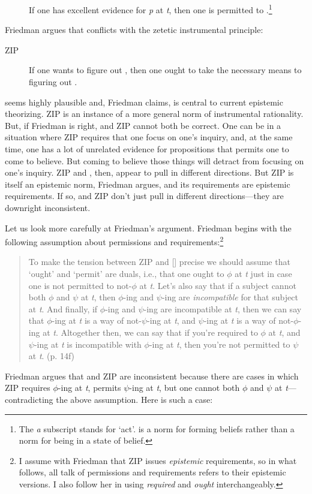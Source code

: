 \documentclass[12pt]{article}
\begin{document}
\begin{description}
    \item[\ep] If one has excellent evidence for \textit{p} at \textit{t}, then one is permitted to \jud{}.\footnote{The \textit{a} subscript stands for `act'. \ep{} is a norm for forming beliefs rather than a norm for being in a state of belief.}
\end{description}
%
Friedman argues that \ep{} conflicts with the zetetic instrumental principle:
%
\begin{description}
    \item[ZIP] If one wants to figure out , then one ought to take the necessary means to figuring out .
\end{description}
%
\ep{} seems highly plausible and, Friedman claims, is central to current epistemic theorizing. ZIP is an instance of a more general norm of instrumental rationality. But, if Friedman is right, \ep{} and ZIP cannot both be correct. One can be in a situation where ZIP requires that one focus on one’s inquiry, and, at the same time, one has a lot of unrelated evidence for propositions that \ep{} permits one to come to believe. But coming to believe those things will detract from focusing on one’s inquiry. ZIP and \ep{}, then, appear to pull in different directions. But ZIP is itself an epistemic norm, Friedman argues, and its requirements are epistemic requirements. If so, \ep{} and ZIP don’t just pull in different directions---they are downright inconsistent.

Let us look more carefully at Friedman’s argument. Friedman begins with the following assumption about permissions and requirements:\footnote{I assume with Friedman that ZIP issues \textit{epistemic} requirements, so in what follows, all talk of permissions and requirements refers to their epistemic versions. I also follow her in using \textit{required} and \textit{ought} interchangeably.}

\begin{quote}
    To make the tension between ZIP and [\ep{}] precise we should assume that `ought' and `permit' are duals, i.e., that one ought to $\phi$ at \textit{t} just in case one is not permitted to not-$\phi$ at \textit{t}. Let's also say that if a subject cannot both $\phi$ and $\psi$ at \textit{t}, then $\phi$-ing and $\psi$-ing are \textit{incompatible} for that subject at \textit{t}. And finally, if $\phi$-ing and $\psi$-ing are incompatible at \textit{t}, then we can say that $\phi$-ing at \textit{t} is a way of not-$\psi$-ing at \textit{t}, and $\psi$-ing at \textit{t} is a way of not-$\phi$-ing at \textit{t}. Altogether then, we can say that if you're required to $\phi$ at \textit{t}, and $\psi$-ing at \textit{t} is incompatible with $\phi$-ing at \textit{t}, then you're not permitted to $\psi$ at \textit{t}. (p. 14f)
\end{quote}
%
Friedman argues that \ep{} and ZIP are inconsistent because there are cases in which ZIP requires $\phi$-ing at \textit{t}, \ep{} permits $\psi$-ing at \textit{t}, but one cannot both $\phi$ and $\psi$ at \textit{t}---contradicting the above assumption. Here is such a case:
\end{document}
